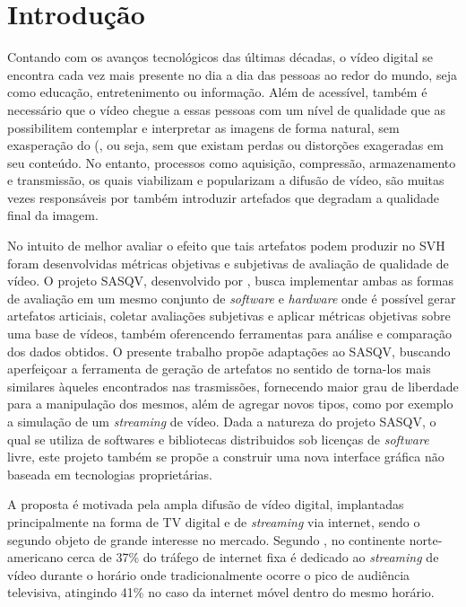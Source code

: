\chapter{Introdução}

Contando com os avanços tecnológicos das últimas décadas, o vídeo digital se encontra cada vez mais presente no dia a dia das pessoas ao redor do mundo, seja como educação, entretenimento ou informação.
Além de acessível, também é necessário que o vídeo chegue a essas pessoas com um nível de qualidade que as possibilitem contemplar e interpretar as imagens de forma natural, sem exasperação do (, ou seja, sem que existam perdas ou distorções exageradas em seu conteúdo.
No entanto, processos como aquisição, compressão, armazenamento e transmissão, os quais viabilizam e popularizam a difusão de vídeo, são muitas vezes responsáveis por também introduzir artefados que degradam a qualidade final da imagem\cite{daronco}.

No intuito de melhor avaliar o efeito que tais artefatos podem produzir no SVH foram desenvolvidas métricas objetivas e subjetivas de avaliação de qualidade de vídeo. O projeto SASQV, desenvolvido por \cite{sasqv}, busca implementar ambas as formas de avaliação em um mesmo conjunto de \emph{software} e \emph{hardware} onde é possível gerar artefatos articiais, coletar avaliações subjetivas e aplicar métricas objetivas sobre uma base de vídeos, também oferencendo ferramentas para análise e comparação dos dados obtidos. O presente trabalho propõe adaptações ao SASQV, buscando aperfeiçoar a ferramenta de  geração de artefatos no sentido de torna-los mais similares àqueles encontrados nas trasmissões, fornecendo maior grau de liberdade para a manipulação dos mesmos, além de agregar novos tipos, como por exemplo a simulação de um \emph{streaming} de vídeo. Dada a natureza do projeto SASQV, o qual se utiliza de softwares e bibliotecas distribuidos sob licenças de \emph{software} livre, este projeto também se propõe a construir uma nova interface gráfica não baseada em tecnologias proprietárias.

A proposta é motivada pela ampla difusão de vídeo digital, implantadas principalmente na forma de TV digital e de \emph{streaming} via internet, sendo o segundo objeto de grande interesse no mercado. Segundo \cite{sandvinereport}, no continente norte-americano cerca de 37\% do tráfego de internet fixa é dedicado ao \emph{streaming} de vídeo durante o horário onde tradicionalmente ocorre o pico de audiência televisiva, atingindo 41\% no caso da internet móvel dentro do mesmo horário.

